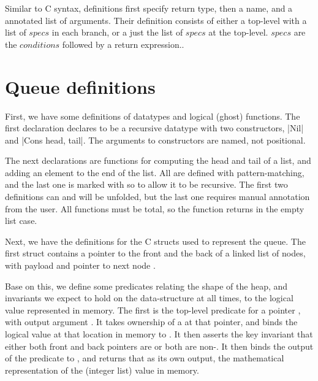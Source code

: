 Similar to C syntax,   definitions first specify return
type, then a name, and a  annotated list of arguments. Their
definition consists of either a top-level  with a list of ${specs}$
in each branch, or a just the list of ${specs}$ at the top-level. ${specs}$ are
the ${conditions}$ followed by a return expression..

\section{Queue definitions}

First, we have some  definitions of datatypes and logical (ghost)
functions. The first declaration declares  to be a recursive
datatype with two constructors, \cninline|Nil{}| and \cninline|Cons {head,
tail}|. The arguments to constructors are named, not positional.

The next declarations are functions for computing the head and tail of a list,
and adding an element to the end of the list. All are defined with
pattern-matching, and the last one is marked with \cninline{[rec]} so to allow
it to be recursive. The first two definitions can and will be unfolded, but the
last one requires manual annotation from the user. All functions must be total,
so the  function returns  in the empty list case.


Next, we have the definitions for the C structs used to represent the queue.
The first struct contains a pointer to the front and the back of a linked list
of  nodes, with payload  and
pointer to next node .


Base on this, we define some predicates relating the shape of the heap, and
invariants we expect to hold on the data-structure at all times, to the logical
value represented in memory. The first is the top-level predicate
 for a pointer , with output %
argument . It takes ownership of a  at that pointer, and binds the logical value at that location in memory
to . It then asserts the key invariant that either both front and
back pointers are  or both are non-. It then
binds the output of the predicate  to , and
returns that as its own output, the mathematical representation of the (integer
list) value in memory.

